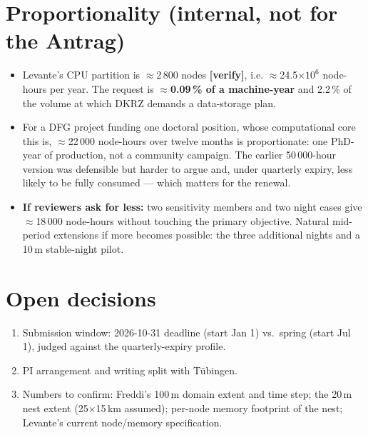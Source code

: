\documentclass[10pt,a4paper]{article}
\newcommand{\ver}{\textbf{[verify]}}
\begin{document}
\section*{Proportionality (internal, not for the Antrag)}
\begin{itemize}
\item Levante's CPU partition is $\approx$2\,800 nodes \ver, i.e.
  $\approx$24.5$\times10^6$ node-hours per year. The request is
  \textbf{$\approx$0.09\,\% of a machine-year} and 2.2\,\% of the volume at
  which DKRZ demands a data-storage plan.
\item For a DFG project funding one doctoral position, whose computational core
  this is, $\approx$22\,000 node-hours over twelve months is proportionate: one
  PhD-year of production, not a community campaign. The earlier 50\,000-hour
  version was defensible but harder to argue and, under quarterly expiry, less
  likely to be fully consumed --- which matters for the renewal.
\item \textbf{If reviewers ask for less:} two sensitivity members and two night
  cases give $\approx$18\,000 node-hours without touching the primary objective.
  Natural mid-period extensions if more becomes possible: the three additional
  nights and a 10\,m stable-night pilot.
\end{itemize}

\section*{Open decisions}
\begin{enumerate}
\item Submission window: 2026-10-31 deadline (start Jan 1) vs.\ spring (start
  Jul 1), judged against the quarterly-expiry profile.
\item PI arrangement and writing split with Tübingen.
\item Numbers to confirm: Freddi's 100\,m domain extent and time step; the 20\,m
  nest extent (25$\times$15\,km assumed); per-node memory footprint of the nest;
  Levante's current node/memory specification.
\end{enumerate}
\end{document}
